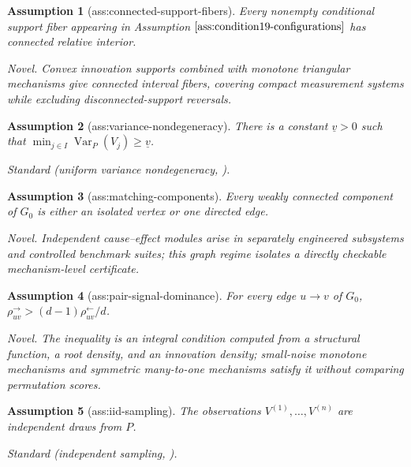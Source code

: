 \documentclass{article}
\newtheorem{assumption}{Assumption}
\begin{document}
\begin{assumption}[ass:connected-support-fibers]\label{ass:connected-support-fibers}
Every nonempty conditional support fiber appearing in Assumption \(\ref{ass:condition19-configurations}\) has connected relative interior.
\par\smallskip\noindent\emph{Novel.} Convex innovation supports combined with monotone triangular mechanisms give connected interval fibers, covering compact measurement systems while excluding disconnected-support reversals.
\end{assumption}

\begin{assumption}[ass:variance-nondegeneracy]\label{ass:variance-nondegeneracy}
There is a constant \(\underline v>0\) such that \(\min_{j\in I}\operatorname{Var}_P(V_j)\ge\underline v\).
\par\smallskip\noindent\emph{Standard} (uniform variance nondegeneracy, \cite{buehlmann2014cam}).
\end{assumption}

\begin{assumption}[ass:matching-components]\label{ass:matching-components}
Every weakly connected component of \(G_0\) is either an isolated vertex or one directed edge.
\par\smallskip\noindent\emph{Novel.} Independent cause--effect modules arise in separately engineered subsystems and controlled benchmark suites; this graph regime isolates a directly checkable mechanism-level certificate.
\end{assumption}

\begin{assumption}[ass:pair-signal-dominance]\label{ass:pair-signal-dominance}
For every edge \(u\to v\) of \(G_0\), \(\rho^{\to}_{uv}>(d-1)\rho^{\leftarrow}_{uv}/d\).
\par\smallskip\noindent\emph{Novel.} The inequality is an integral condition computed from a structural function, a root density, and an innovation density; small-noise monotone mechanisms and symmetric many-to-one mechanisms satisfy it without comparing permutation scores.
\end{assumption}

\begin{assumption}[ass:iid-sampling]\label{ass:iid-sampling}
The observations \(V^{(1)},\ldots,V^{(n)}\) are independent draws from \(P\).
\par\smallskip\noindent\emph{Standard} (independent sampling, \cite{pfister2018dhsic}).
\end{assumption}
\end{document}
